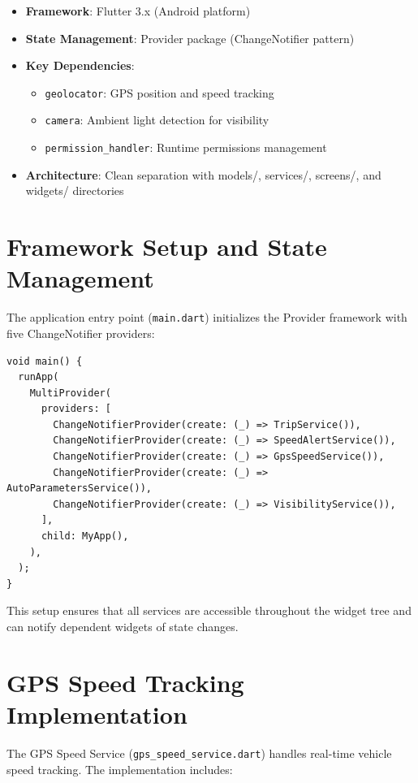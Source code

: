 \begin{itemize}
    \item \textbf{Framework}: Flutter 3.x (Android platform)
    \item \textbf{State Management}: Provider package (ChangeNotifier pattern)
    \item \textbf{Key Dependencies}:
    \begin{itemize}
        \item \texttt{geolocator}: GPS position and speed tracking
        \item \texttt{camera}: Ambient light detection for visibility
        \item \texttt{permission\_handler}: Runtime permissions management
    \end{itemize}
    \item \textbf{Architecture}: Clean separation with models/, services/, screens/, and widgets/ directories
\end{itemize}

\section{Framework Setup and State Management}
The application entry point (\texttt{main.dart}) initializes the Provider framework with five ChangeNotifier providers:

\begin{verbatim}
void main() {
  runApp(
    MultiProvider(
      providers: [
        ChangeNotifierProvider(create: (_) => TripService()),
        ChangeNotifierProvider(create: (_) => SpeedAlertService()),
        ChangeNotifierProvider(create: (_) => GpsSpeedService()),
        ChangeNotifierProvider(create: (_) => AutoParametersService()),
        ChangeNotifierProvider(create: (_) => VisibilityService()),
      ],
      child: MyApp(),
    ),
  );
}
\end{verbatim}

This setup ensures that all services are accessible throughout the widget tree and can notify dependent widgets of state changes.

\section{GPS Speed Tracking Implementation}
The GPS Speed Service (\texttt{gps\_speed\_service.dart}) handles real-time vehicle speed tracking. The implementation includes:

